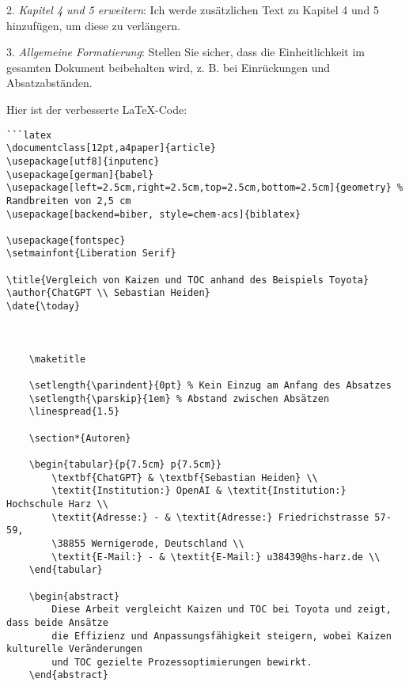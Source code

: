 2. \textit{Kapitel 4 und 5 erweitern}: Ich werde zusätzlichen Text zu Kapitel 4 und 5 hinzufügen, um diese zu verlängern.

3. \textit{Allgemeine Formatierung}: Stellen Sie sicher, dass die Einheitlichkeit im gesamten Dokument beibehalten wird, z. B. bei Einrückungen und Absatzabständen.

Hier ist der verbesserte \LaTeX{}-Code:

\begin{verbatim}
```latex
\documentclass[12pt,a4paper]{article}
\usepackage[utf8]{inputenc}
\usepackage[german]{babel}
\usepackage[left=2.5cm,right=2.5cm,top=2.5cm,bottom=2.5cm]{geometry} % Randbreiten von 2,5 cm
\usepackage[backend=biber, style=chem-acs]{biblatex}

\usepackage{fontspec}
\setmainfont{Liberation Serif}

\title{Vergleich von Kaizen und TOC anhand des Beispiels Toyota}
\author{ChatGPT \\ Sebastian Heiden}
\date{\today}


	
	\maketitle
	
	\setlength{\parindent}{0pt} % Kein Einzug am Anfang des Absatzes
	\setlength{\parskip}{1em} % Abstand zwischen Absätzen
	\linespread{1.5}
	
	\section*{Autoren}
	
	\begin{tabular}{p{7.5cm} p{7.5cm}}
		\textbf{ChatGPT} & \textbf{Sebastian Heiden} \\
		\textit{Institution:} OpenAI & \textit{Institution:} Hochschule Harz \\
		\textit{Adresse:} - & \textit{Adresse:} Friedrichstrasse 57-59, 
		\38855 Wernigerode, Deutschland \\
		\textit{E-Mail:} - & \textit{E-Mail:} u38439@hs-harz.de \\
	\end{tabular}
	
	\begin{abstract}
		Diese Arbeit vergleicht Kaizen und TOC bei Toyota und zeigt, dass beide Ansätze 
		die Effizienz und Anpassungsfähigkeit steigern, wobei Kaizen kulturelle Veränderungen 
		und TOC gezielte Prozessoptimierungen bewirkt.
	\end{abstract}
	

\end{verbatim}
